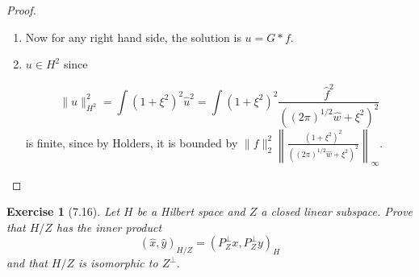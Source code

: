 \documentclass[letterpaper,twoside,11pt]{article}
\theoremstyle{mystyle}
\newtheorem*{exercise}{Exercise}
\begin{document}
\begin{proof}
\begin{enumerate}
    \item Now for any right hand side, the solution is $u = G \ast f$. 
    

    \item $u\in H^2$ since 
    
    \[\|u\|_{H^2}^2 = \int \left( 1+\xi^2 \right)^2 \hat u^2 = \int \left( 1+\xi^2 \right)^2 \frac{\hat f ^2}{((2\pi)^{1/2} \hat w + \xi^2)^2}\] 
    is finite, since by Holders, it is bounded by $\|f\|^2_2 \left\| \frac{(1+\xi^2)^2}{((2\pi)^{1/2} \hat w + \xi^2)^2}\right\|_\infty$.
    
    

  \end{enumerate}
\end{proof}












\begin{exercise}[7.16]
  Let $H$ be a Hilbert space and $Z$ a closed linear subspace. Prove that $H/Z$ has the inner product 
  \[\left( \hat x, \hat y \right)_{H/Z} = \left( P_Z^{\perp} x,P_Z^{\perp} y  \right)_H\]
  and that $H/Z$ is isomorphic to $Z^\perp$.
\end{exercise}
\end{document}
